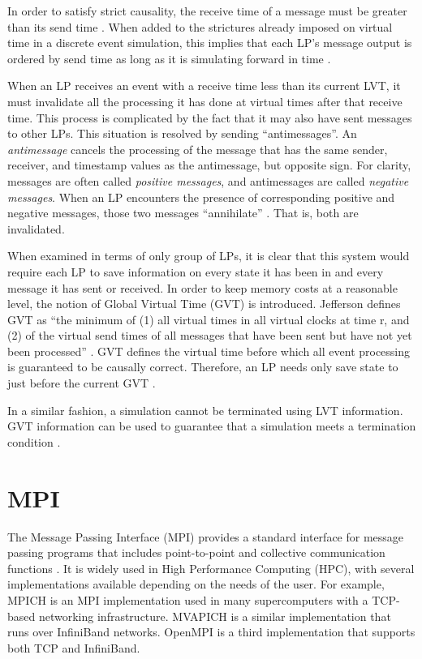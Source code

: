 \documentclass[11pt]{book}
\begin{document}
In order to satisfy strict causality, the receive time of a message must be
greater than its send time \cite{lamport-78}. When added to the strictures
already imposed on virtual time in a discrete event simulation, this implies
that each LP's message output is ordered by send time as long as it is
simulating forward in time \cite{jefferson-85}.

When an LP receives an event with a receive time less than its current LVT, it
must invalidate all the processing it has done at virtual times after that
receive time. This process is complicated by the fact that it may also have sent
messages to other LPs. This situation is resolved by sending
``antimessages''. An \textit{antimessage} cancels the processing of the message
that has the same sender, receiver, and timestamp values as the antimessage, but
opposite sign. For clarity, messages are often called \textit{positive
  messages}, and antimessages are called \textit{negative messages}. When an LP
encounters the presence of corresponding positive and negative messages, those
two messages ``annihilate'' \cite{jefferson-85}. That is, both are invalidated.

When examined in terms of only group of LPs, it is clear that this system would
require each LP to save information on every state it has been in and every
message it has sent or received. In order to keep memory costs at a reasonable
level, the notion of Global Virtual Time (GVT) is introduced. Jefferson defines
GVT as ``the minimum of (1) all virtual times in all virtual clocks at time r,
and (2) of the virtual send times of all messages that have been sent but have
not yet been processed'' \cite{jefferson-85}. GVT defines the virtual time
before which all event processing is guaranteed to be causally
correct. Therefore, an LP needs only save state to just before the current GVT
\cite{fujimoto-89b}.

In a similar fashion, a simulation cannot be terminated using LVT
information. GVT information can be used to guarantee that a simulation meets a
termination condition \cite{jefferson-85}.

\section{\textbf{MPI}}

The Message Passing Interface (MPI) provides a standard interface for message
passing programs that includes point-to-point and collective communication
functions \cite{mpi-12}. It is widely used in High Performance Computing (HPC), with several
implementations available depending on the needs of the user. For example, MPICH
\cite{mpich} is an MPI implementation used in many supercomputers with a
TCP-based networking infrastructure. MVAPICH \cite{mvapich} is a similar
implementation that runs over InfiniBand networks. OpenMPI \cite{openmpi} is a
third implementation that supports both TCP and InfiniBand.
\end{document}
